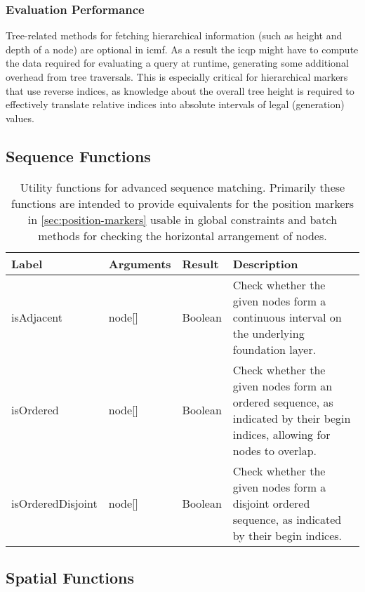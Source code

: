\documentclass[11pt,a4paper]{article}
\begin{document}
\subsubsection{Evaluation Performance}
\label{sec:hierarchy-markers-performance}
Tree-related methods for fetching hierarchical information (such as height and depth of a node) are optional in \ac{icmf}.
As a result the \ac{icqp} might have to compute the data required for evaluating a query at runtime, generating some additional overhead from tree traversals. 
This is especially critical for hierarchical markers that use reverse indices, as knowledge about the overall tree height is required to effectively translate relative indices into absolute intervals of legal (generation) values.

\subsection{Sequence Functions}
\label{sec:sequence-functions}

\begin{table}[!htb]\centering
	\begin{tabular}{|p{}|p{}|p{}|p{}|}
		\hline 
		\textbf{Label} & \textbf{Arguments} & \textbf{Result} & Description \\ 
		\hline 
		\hline  
		isAdjacent & node[] & Boolean & Check whether the given nodes form a continuous interval on the underlying foundation layer. \\ 
		\hline  
		isOrdered & node[] & Boolean & Check whether the given nodes form an ordered sequence, as indicated by their begin indices, allowing for nodes to overlap. \\ 
		\hline  
		isOrderedDisjoint & node[] & Boolean & Check whether the given nodes form a disjoint ordered sequence, as indicated by their begin indices. \\ 
		\hline 
	\end{tabular}
	\caption[Sequence functions]{Utility functions for advanced sequence matching. Primarily these functions are intended to provide equivalents for the position markers in \cref{sec:position-markers} usable in global constraints and batch methods for checking the horizontal arrangement of nodes.}
	\label{tab:sequence-functions}
\end{table}

\subsection{Spatial Functions}
\label{sec:relative-markers}
\end{document}
